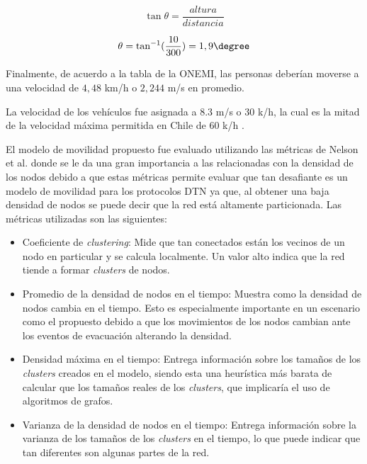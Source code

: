 \begin{equation}
  \tan \theta = \frac{altura}{distancia}
  \label{eq:pendiente}
\end{equation}


\begin{equation}
  \theta = \tan^{-1}(\frac{10}{300}) = 1,9 \degree
  \label{eq:pendiente_resultado}
\end{equation}

Finalmente, de acuerdo a la tabla de la ONEMI, las personas deberían moverse a
una velocidad de $4,48$ km/h o $2,244$ m/s en promedio.

La velocidad de los vehículos fue asignada a $8.3$ m/s o $30$ k/h, la cual es la
mitad de la velocidad máxima permitida en Chile de $60$ k/h \cite{velocidad}.




El modelo de movilidad propuesto fue evaluado utilizando las métricas de Nelson
et al. \cite{Nelson2007} donde se le da una gran importancia a las relacionadas
con la densidad de los nodos debido a que estas métricas permite evaluar que tan
desafiante es un modelo de movilidad para los protocolos DTN ya que, al obtener
una baja densidad de nodos se puede decir que la red está altamente
particionada. Las métricas utilizadas son las siguientes:

\begin{itemize}
  \item Coeficiente de \textit{clustering}: Mide que tan conectados están los
    vecinos de un nodo en particular y se calcula localmente. Un valor alto
    indica que la red tiende a formar \textit{clusters} de nodos.
  \item Promedio de la densidad de nodos en el tiempo: Muestra como la densidad
    de nodos cambia en el tiempo. Esto es especialmente importante en un
    escenario como el propuesto debido a que los movimientos de los nodos
    cambian ante los eventos de evacuación alterando la densidad.
  \item Densidad máxima en el tiempo: Entrega información sobre los tamaños de
    los \textit{clusters} creados en el modelo, siendo esta una heurística más
    barata de calcular que los tamaños reales de los \textit{clusters}, que
    implicaría el uso de algoritmos de grafos.
  \item Varianza de la densidad de nodos en el tiempo: Entrega información sobre
    la varianza de los tamaños de los \textit{clusters} en el tiempo, lo que
    puede indicar que tan diferentes son algunas partes de la red.
\end{itemize}

